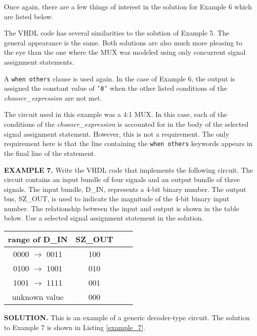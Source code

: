 Once again, there are a few things of interest in the solution for Example 6 which are listed below.
\begin{my_list}
\item The VHDL code has several similarities to the solution of Example 5. The general appearance is the same. Both solutions are also much more pleasing to the eye than the one where the MUX was modeled using only concurrent signal assignment statements.
\item A \texttt{when others} clause is used again. In the case of Example 6, the output is assigned the constant value of \texttt{'0'} when the other listed conditions of the \textit{chooser\_expression} are not met.
\item The circuit used in this example was a 4:1 MUX. In this case, each of the conditions of the \textit{chooser\_expression} is accounted for in the body of the selected signal assignment statement. However, this is not a requirement. The only requirement here is that the line containing the \texttt{when others} keywords appears in the final line of the statement.
\end{my_list}

\begin{leftbar}
\noindent
\textbf{EXAMPLE 7.} Write the VHDL code that implements the following circuit. The circuit contains an input bundle of four signals and an output bundle of three signals. The input bundle, D\_IN, represents a 4-bit binary number. The output bus, SZ\_OUT, is used to indicate the magnitude of the 4-bit binary input number. The relationship between the input and output is shown in the table below. Use a selected signal assignment statement in the solution.

\centering\vspace{5pt}
\begin{tabular}{c*{2}{c}r}
range of D\_IN  & SZ\_OUT \\
\hline
0000 $\rightarrow$ 0011 & 100 \\
0100 $\rightarrow$ 1001 & 010 \\
1001 $\rightarrow$ 1111 & 001 \\
unknown value		& 000 \\
\end{tabular}
\end{leftbar}
\noindent
\textbf{SOLUTION.} This is an example of a generic decoder-type circuit. The solution to Example 7 is shown in Listing \ref{example_7}.

\noindent
\begin{minipage}{0.99\linewidth}
\centering
{}
\end{minipage}

